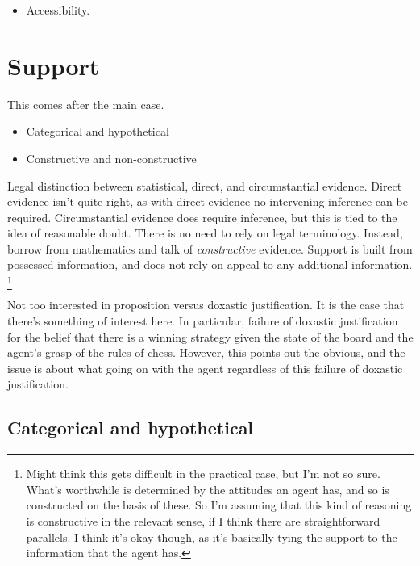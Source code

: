 \documentclass[10pt]{article}
\begin{document}
\begin{itemize}
\item Accessibility.
\end{itemize}

\section{Support}
\label{sec:support}

\begin{note}
  This comes after the main case.
\end{note}

\begin{itemize}
\item Categorical and hypothetical
\item Constructive and non-constructive
\end{itemize}


Legal distinction between statistical, direct, and circumstantial evidence.
Direct evidence isn't quite right, as with direct evidence no intervening inference can be required.
Circumstantial evidence does require inference, but this is tied to the idea of reasonable doubt.
There is no need to rely on legal terminology.
Instead, borrow from mathematics and talk of \emph{constructive} evidence.
Support is built from possessed information, and does not rely on appeal to any additional information.\nolinebreak
\footnote{
  Might think this gets difficult in the practical case, but I'm not so sure.
  What's worthwhile is determined by the attitudes an agent has, and so is constructed on the basis of these.
  So I'm assuming that this kind of reasoning is constructive in the relevant sense, if I think there are straightforward parallels.
  I think it's okay though, as it's basically tying the support to the information that the agent has.
}

Not too interested in proposition versus doxastic justification.
It is the case that there's something of interest here.
In particular, failure of doxastic justification for the belief that there is a winning strategy given the state of the board and the agent's grasp of the rules of chess.
However, this points out the obvious, and the issue is about what going on with the agent regardless of this failure of doxastic justification.

\subsection{Categorical and hypothetical}
\label{sec:categ-hypoth}
\end{document}
